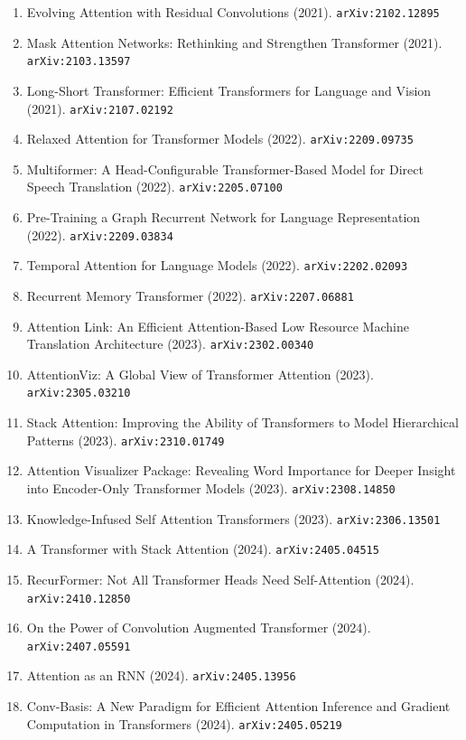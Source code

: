 \documentclass[11pt]{article}
\begin{document}
\begin{enumerate}
  Structures (2021). \texttt{arXiv:2106.05822}
  \item Evolving Attention with Residual Convolutions (2021). \texttt{arXiv:2102.12895}
  \item Mask Attention Networks: Rethinking and Strengthen Transformer (2021). \texttt{arXiv:2103.13597}
  \item Long-Short Transformer: Efficient Transformers for Language and Vision (2021). \texttt{arXiv:2107.02192}
  \item Relaxed Attention for Transformer Models (2022). \texttt{arXiv:2209.09735}
  \item Multiformer: A Head-Configurable Transformer-Based Model for Direct
  Speech Translation (2022). \texttt{arXiv:2205.07100}
  \item Pre-Training a Graph Recurrent Network for Language Representation (2022). \texttt{arXiv:2209.03834}
  \item Temporal Attention for Language Models (2022). \texttt{arXiv:2202.02093}
  \item Recurrent Memory Transformer (2022). \texttt{arXiv:2207.06881}
  \item Attention Link: An Efficient Attention-Based Low Resource Machine
  Translation Architecture (2023). \texttt{arXiv:2302.00340}
  \item AttentionViz: A Global View of Transformer Attention (2023). \texttt{arXiv:2305.03210}
  \item Stack Attention: Improving the Ability of Transformers to Model
  Hierarchical Patterns (2023). \texttt{arXiv:2310.01749}
  \item Attention Visualizer Package: Revealing Word Importance for Deeper
  Insight into Encoder-Only Transformer Models (2023). \texttt{arXiv:2308.14850}
  \item Knowledge-Infused Self Attention Transformers (2023). \texttt{arXiv:2306.13501}
  \item A Transformer with Stack Attention (2024). \texttt{arXiv:2405.04515}
  \item RecurFormer: Not All Transformer Heads Need Self-Attention (2024). \texttt{arXiv:2410.12850}
  \item On the Power of Convolution Augmented Transformer (2024). \texttt{arXiv:2407.05591}
  \item Attention as an RNN (2024). \texttt{arXiv:2405.13956}
  \item Conv-Basis: A New Paradigm for Efficient Attention Inference and
  Gradient Computation in Transformers (2024). \texttt{arXiv:2405.05219}

\end{enumerate}
\end{document}
